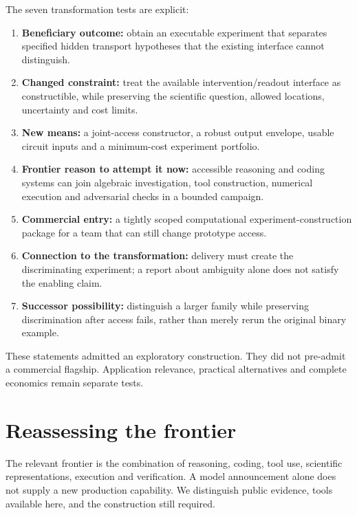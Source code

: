 \documentclass[
  11pt,
]{article}
\providecommand{\tightlist}{%
  \setlength{\itemsep}{0pt}\setlength{\parskip}{0pt}}
\begin{document}
The seven transformation tests are explicit:

\begin{enumerate}
\def\labelenumi{\arabic{enumi}.}
\tightlist
\item
  \textbf{Beneficiary outcome:} obtain an executable experiment that
  separates specified hidden transport hypotheses that the existing
  interface cannot distinguish.
\item
  \textbf{Changed constraint:} treat the available intervention/readout
  interface as constructible, while preserving the scientific question,
  allowed locations, uncertainty and cost limits.
\item
  \textbf{New means:} a joint-access constructor, a robust output
  envelope, usable circuit inputs and a minimum-cost experiment
  portfolio.
\item
  \textbf{Frontier reason to attempt it now:} accessible reasoning and
  coding systems can join algebraic investigation, tool construction,
  numerical execution and adversarial checks in a bounded campaign.
\item
  \textbf{Commercial entry:} a tightly scoped computational
  experiment-construction package for a team that can still change
  prototype access.
\item
  \textbf{Connection to the transformation:} delivery must create the
  discriminating experiment; a report about ambiguity alone does not
  satisfy the enabling claim.
\item
  \textbf{Successor possibility:} distinguish a larger family while
  preserving discrimination after access fails, rather than merely rerun
  the original binary example.
\end{enumerate}

These statements admitted an exploratory construction. They did not
pre-admit a commercial flagship. Application relevance, practical
alternatives and complete economics remain separate tests.

\hypertarget{reassessing-the-frontier}{%
\section{Reassessing the frontier}\label{reassessing-the-frontier}}

The relevant frontier is the combination of reasoning, coding, tool use,
scientific representations, execution and verification. A model
announcement alone does not supply a new production capability. We
distinguish public evidence, tools available here, and the construction
still required.
\end{document}
